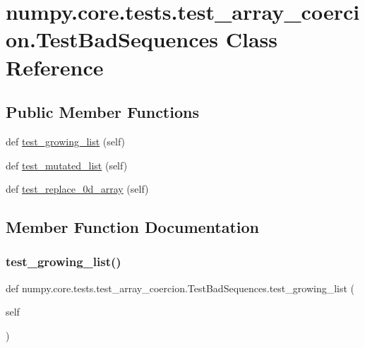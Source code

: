 \hypertarget{classnumpy_1_1core_1_1tests_1_1test__array__coercion_1_1TestBadSequences}{}\section{numpy.\+core.\+tests.\+test\+\_\+array\+\_\+coercion.\+Test\+Bad\+Sequences Class Reference}
\label{classnumpy_1_1core_1_1tests_1_1test__array__coercion_1_1TestBadSequences}
\subsection*{Public Member Functions}
\begin{DoxyCompactItemize}
\item 
def \hyperlink{classnumpy_1_1core_1_1tests_1_1test__array__coercion_1_1TestBadSequences_a06be7d5617ca212092148724469ccab1}{test\+\_\+growing\+\_\+list} (self)
\item 
def \hyperlink{classnumpy_1_1core_1_1tests_1_1test__array__coercion_1_1TestBadSequences_a93faf862b12e1f225e795958e0638301}{test\+\_\+mutated\+\_\+list} (self)
\item 
def \hyperlink{classnumpy_1_1core_1_1tests_1_1test__array__coercion_1_1TestBadSequences_abbc98f3a3848999209a727c727b1350f}{test\+\_\+replace\+\_\+0d\+\_\+array} (self)
\end{DoxyCompactItemize}


\subsection{Member Function Documentation}
\mbox{\label{classnumpy_1_1core_1_1tests_1_1test__array__coercion_1_1TestBadSequences_a06be7d5617ca212092148724469ccab1}} 
\subsubsection{\texorpdfstring{test\+\_\+growing\+\_\+list()}{test\_growing\_list()}}
{\footnotesize\ttfamily def numpy.\+core.\+tests.\+test\+\_\+array\+\_\+coercion.\+Test\+Bad\+Sequences.\+test\+\_\+growing\+\_\+list (\begin{DoxyParamCaption}\item[{}]{self }\end{DoxyParamCaption})}

